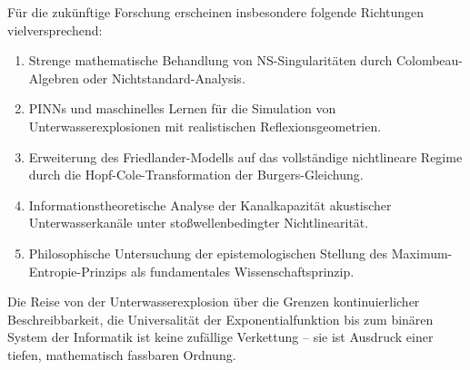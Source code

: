 ﻿\documentclass[12pt,a4paper]{article}
\theoremstyle{definition}
\theoremstyle{remark}
\begin{document}
Für die zukünftige Forschung erscheinen insbesondere folgende Richtungen vielversprechend:
\begin{enumerate}
\item Strenge mathematische Behandlung von NS-Singularitäten durch Colombeau-Alge\-bren oder Nichtstandard-Analysis.
\item PINNs und maschinelles Lernen für die Simulation von Unterwasserexplosionen mit realistischen Reflexionsgeometrien.
\item Erweiterung des Friedlander-Modells auf das vollständige nichtlineare Regime durch die Hopf-Cole-Transformation der Burgers-Gleichung.
\item Informationstheoretische Analyse der Kanalkapazität akustischer Unterwasserkanäle unter stoßwellenbedingter Nichtlinearität.
\item Philosophische Untersuchung der epistemologischen Stellung des Maximum-Entropie-Prinzips als fundamentales Wissenschaftsprinzip.
\end{enumerate}

Die Reise von der Unterwasserexplosion über die Grenzen kontinuierlicher Beschreibbarkeit, die Universalität der Exponentialfunktion bis zum binären System der Informatik ist keine zufällige Verkettung -- sie ist Ausdruck einer tiefen, mathematisch fassbaren Ordnung.
\end{document}
